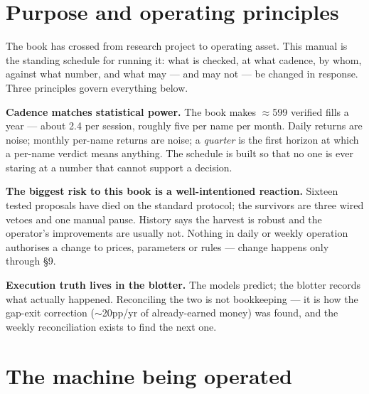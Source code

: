 \documentclass[11pt,a4paper]{article}
\begin{document}
\section{Purpose and operating principles}

The book has crossed from research project to operating asset. This manual is
the standing schedule for running it: what is checked, at what cadence, by
whom, against what number, and what may --- and may not --- be changed in
response. Three principles govern everything below.

\textbf{Cadence matches statistical power.} The book makes $\approx$599
verified fills a year --- about 2.4 per session, roughly five per name per
month. Daily returns are noise; monthly per-name returns are noise; a
\emph{quarter} is the first horizon at which a per-name verdict means
anything. The schedule is built so that no one is ever staring at a number
that cannot support a decision.

\textbf{The biggest risk to this book is a well-intentioned reaction.}
Sixteen tested proposals have died on the standard protocol; the survivors
are three wired vetoes and one manual pause. History says the harvest is
robust and the operator's improvements are usually not. Nothing in daily or
weekly operation authorises a change to prices, parameters or rules ---
change happens only through \S9.

\textbf{Execution truth lives in the blotter.} The models predict; the
blotter records what actually happened. Reconciling the two is not
bookkeeping --- it is how the gap-exit correction ($\sim$20pp/yr of
already-earned money) was found, and the weekly reconciliation exists to
find the next one.

\section{The machine being operated}
\end{document}
